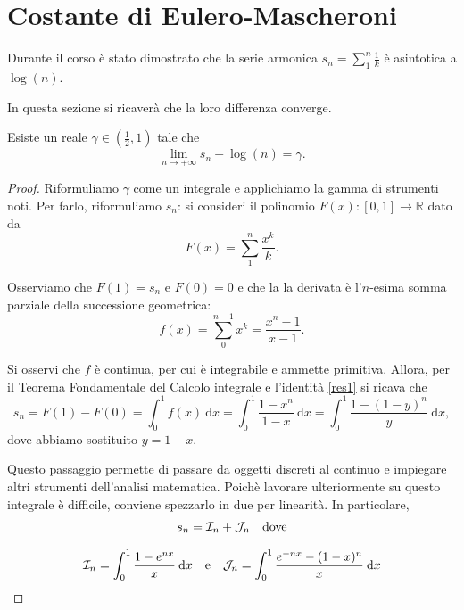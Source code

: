 \chapter{Costante di Eulero-Mascheroni}
Durante il corso è stato dimostrato che la serie armonica $s_n=\sum^n_1\frac{1}{k}$ è asintotica a $\log(n)$.

In questa sezione si ricaverà che la loro differenza converge.

\begin{Res} Esiste un reale $\gamma\in\left( \frac{1}{2},1\right)$ tale che
	\[
		\lim\limits_{n\to+\infty}s_n-\log(n)=\gamma.
	\]
\end{Res}
\begin{proof}
	Riformuliamo $\gamma$ come un integrale e applichiamo la gamma di strumenti noti. Per farlo, riformuliamo $s_n$: si consideri il polinomio $F(x):[0,1]\to\mathbb{R}$ dato da
	\[
		F(x)=\sum^n_1\frac{x^k}{k}.
	\]

	Osserviamo che $F(1)=s_n$ e $F(0)=0$ e che la la derivata è l'$n$-esima somma parziale della successione geometrica:
	\begin{equation}
		\label{res1}
		f(x)=\sum^{n-1}_0x^k=\frac{x^n-1}{x-1}.
	\end{equation}

	Si osservi che $f$ è continua, per cui è integrabile e ammette primitiva. Allora, per il Teorema Fondamentale del Calcolo integrale e l'identità \ref{res1} si ricava che
	\[
		s_n=F(1)-F(0)=\int^1_0f(x)\:\mathrm{d}x=\int^1_0\frac{1-x^n}{1-x}\:\mathrm{d}x=\int^1_0\frac{1-(1-y)^n}{y}\:\mathrm{d}x,
	\]
	dove abbiamo sostituito $y=1-x$.

	Questo passaggio permette di passare da oggetti discreti al continuo e impiegare altri strumenti dell'analisi matematica. Poichè lavorare ulteriormente su questo integrale è difficile, conviene spezzarlo in due per linearità. In particolare,
	\begin{equation*}
		\begin{gathered}
			s_n=\mathcal{I}_n+\mathcal{J}_n \quad \text{dove} \\[0.5\baselineskip]
			\mathcal{I}_n=\int^1_0\frac{1-e^{nx}}{x}\:\mathrm{d}x \quad \text{e} \quad \mathcal{J}_n=\int^1_0\frac{e^{-nx}-(1-x)^n}{x}\:\mathrm{d}x
		\end{gathered}
	\end{equation*}


\end{proof}
